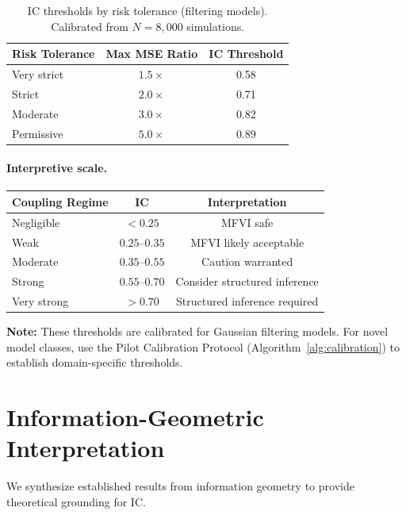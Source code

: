 \documentclass[10pt]{article} %
\theoremstyle{plain}
\theoremstyle{definition}
\begin{document}
\begin{table}[!htbp]
\centering
\caption{IC thresholds by risk tolerance (filtering models). Calibrated from $N = 8{,}000$ simulations.}
\label{tab:ic-thresholds}
\begin{tabular}{lcc}
\toprule
Risk Tolerance & Max MSE Ratio & IC Threshold \\
\midrule
Very strict & $1.5\times$ & 0.58 \\
Strict & $2.0\times$ & 0.71 \\
Moderate & $3.0\times$ & 0.82 \\
Permissive & $5.0\times$ & 0.89 \\
\bottomrule
\end{tabular}
\end{table}

\paragraph{Interpretive scale.}
\begin{table}[!htbp]
\centering
\begin{tabular}{lcc}
\toprule
Coupling Regime & IC & Interpretation \\
\midrule
Negligible & $< 0.25$ & MFVI safe \\
Weak & $0.25$--$0.35$ & MFVI likely acceptable \\
Moderate & $0.35$--$0.55$ & Caution warranted \\
Strong & $0.55$--$0.70$ & Consider structured inference \\
Very strong & $> 0.70$ & Structured inference required \\
\bottomrule
\end{tabular}
\end{table}

\textbf{Note:} These thresholds are calibrated for Gaussian filtering models. For novel model classes, use the Pilot Calibration Protocol (Algorithm~\ref{alg:calibration}) to establish domain-specific thresholds.
\section{Information-Geometric Interpretation}
\label{sec:geometry}

We synthesize established results from information geometry \citep{amari2016information} to provide theoretical grounding for IC.
\end{document}

